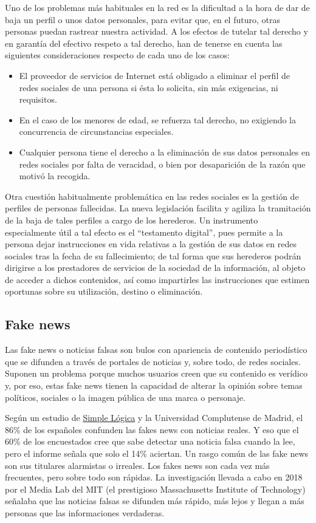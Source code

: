Uno de los problemas más habituales en la red es la dificultad a la hora de dar de baja un perfil o unos datos personales, para evitar que, en el futuro, otras personas puedan rastrear nuestra actividad. A los efectos de tutelar tal derecho y en garantía del efectivo respeto a tal derecho, han de tenerse  en cuenta las siguientes consideraciones respecto de cada uno de los casos:
\begin{itemize}
    \item El proveedor de servicios de Internet está obligado a eliminar el perfil de redes sociales de una persona si ésta lo solicita, sin más exigencias, ni requisitos.
    \item En el caso de los menores de edad, se refuerza tal derecho, no exigiendo la concurrencia de circunstancias especiales.
    \item Cualquier persona tiene el derecho a la eliminación de sus datos personales en redes sociales por falta de veracidad, o bien por desaparición de la razón que motivó la recogida.
\end{itemize}

Otra cuestión habitualmente problemática en las redes sociales es la gestión de perfiles de personas fallecidas. La nueva legislación facilita y agiliza la tramitación de la baja de tales perfiles a cargo de los herederos. Un instrumento especialmente útil a tal efecto es el “testamento digital”, pues permite a la persona dejar instrucciones en vida relativas a la gestión de sus datos en redes sociales tras la fecha de su fallecimiento; de tal forma que sus herederos podrán dirigirse a los prestadores de servicios de la sociedad de la información, al objeto de acceder a dichos contenidos, así como impartirles las instrucciones que estimen oportunas sobre su utilización, destino o eliminación.

\subsection{Fake news}

Las fake news o noticias falsas son bulos con apariencia de contenido periodístico que se difunden a través de portales de noticias y, sobre todo, de redes sociales. Suponen un problema porque muchos usuarios creen que su contenido es verídico y, por eso, estas fake news tienen la capacidad de alterar la opinión sobre temas políticos, sociales o la imagen pública de una marca o personaje.

Según un estudio de \href{https://www.simplelogica.com/es/}{Simple Lógica} y la Universidad Complutense de Madrid, el 86\% de los españoles confunden las fakes news con noticias reales. Y eso que el 60\% de los encuestados cree que sabe detectar una noticia falsa cuando la lee, pero el informe señala que solo el 14\% aciertan. Un rasgo común de las fake news son sus titulares alarmistas o irreales. Los fakes news son cada vez más frecuentes, pero sobre todo son rápidas. La investigación llevada a cabo en 2018 por el Media Lab del MIT (el prestigioso Massachusetts Institute of Technology) señalaba que las noticias falsas se difunden más rápido, más lejos y llegan a más personas que las informaciones verdaderas. 

